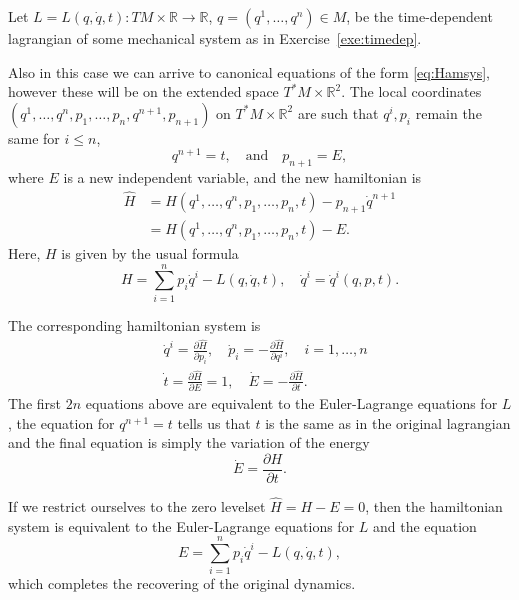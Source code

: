 \documentclass[english,fontsize=11pt,paper=b5]{scrbook}
\numberwithin{equation}{chapter}
\theoremstyle{definition}
\begin{document}
    Let $L=L(q,\dot q,t): TM\times\mathbb{R}\to\mathbb{R}$, $q=(q^1,\ldots,q^n)\in M$, be the time-dependent lagrangian of some mechanical system as in Exercise~\ref{exe:timedep}.

    Also in this case we can arrive to canonical equations of the form \eqref{eq:Hamsys}, however these will be on the extended space $T^*M\times\mathbb{R}^2$. The local coordinates $(q^1,\ldots,q^n, p_1, \ldots,p_n, q^{n+1}, p_{n+1})$ on $T^*M\times\mathbb{R}^2$ are such that $q^i, p_i$ remain the same for $i\leq n$,
    \begin{equation}
      q^{n+1} = t, \quad\mbox{and}\quad
      p_{n+1} = E,
    \end{equation}
    where $E$ is a new independent variable, and the new hamiltonian is
    \begin{align}
      \hat H & = H(q^1, \ldots, q^n, p_1, \ldots, p_n, t) - p_{n+1}\dot q^{n+1} \\
             & = H(q^1, \ldots, q^n, p_1, \ldots, p_n, t) - E.
    \end{align}
    Here, $H$ is given by the usual formula
    \begin{equation}
      H = \sum_{i=1}^n p_i \dot q^i - L(q, \dot q, t), \quad \dot q^i = \dot q^i(q,p,t).
    \end{equation}

    The corresponding hamiltonian system is
    \begin{align}
   & \dot q^i = \frac{\partial \hat H}{\partial p_i}, \quad
   \dot p_i = -\frac{\partial \hat H}{\partial q^i}, \quad
   i=1,\ldots,n                                                                                              \\
   & \dot t = \frac{\partial \hat H}{\partial E} = 1, \quad {\dot E} = -\frac{\partial \hat H}{\partial t}.
    \end{align}
    The first $2n$ equations above are equivalent to the Euler-Lagrange equations for $L$, the equation for $q^{n+1} = t$ tells us that $t$ is the same as in the original lagrangian and the final equation is simply the variation of the energy
    \begin{equation}
      \dot E = \frac{\partial H}{\partial t}.
    \end{equation}

    If we restrict ourselves to the zero levelset $\hat H = H - E = 0$, then the hamiltonian system is equivalent to the Euler-Lagrange equations for $L$ and the equation
    \begin{equation}
      E = \sum_{i=1}^n p_i \dot q^i - L(q, \dot q, t),
    \end{equation}
    which completes the recovering of the original dynamics.
\end{document}
